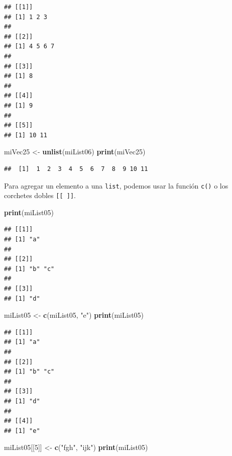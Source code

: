 \documentclass[
]{book}
\newenvironment{Shaded}{\begin{snugshade}}{\end{snugshade}}
\newcommand{\DecValTok}[1]{\textcolor[rgb]{0.00,0.00,0.81}{#1}}
\newcommand{\KeywordTok}[1]{\textcolor[rgb]{0.13,0.29,0.53}{\textbf{#1}}}
\newcommand{\NormalTok}[1]{#1}
\newcommand{\StringTok}[1]{\textcolor[rgb]{0.31,0.60,0.02}{#1}}
\begin{document}
\begin{verbatim}
## [[1]]
## [1] 1 2 3
## 
## [[2]]
## [1] 4 5 6 7
## 
## [[3]]
## [1] 8
## 
## [[4]]
## [1] 9
## 
## [[5]]
## [1] 10 11
\end{verbatim}

\begin{Shaded}
\begin{Highlighting}[]
\NormalTok{miVec25 <-}\StringTok{ }\KeywordTok{unlist}\NormalTok{(miList06)}
\KeywordTok{print}\NormalTok{(miVec25)}
\end{Highlighting}
\end{Shaded}

\begin{verbatim}
##  [1]  1  2  3  4  5  6  7  8  9 10 11
\end{verbatim}

Para agregar un elemento a una \texttt{list}, podemos usar la función \texttt{c()} o los corchetes dobles \texttt{{[}{[}\ {]}{]}}.

\begin{Shaded}
\begin{Highlighting}[]
\KeywordTok{print}\NormalTok{(miList05)}
\end{Highlighting}
\end{Shaded}

\begin{verbatim}
## [[1]]
## [1] "a"
## 
## [[2]]
## [1] "b" "c"
## 
## [[3]]
## [1] "d"
\end{verbatim}

\begin{Shaded}
\begin{Highlighting}[]
\NormalTok{miList05 <-}\StringTok{ }\KeywordTok{c}\NormalTok{(miList05, }\StringTok{"e"}\NormalTok{)}
\KeywordTok{print}\NormalTok{(miList05)}
\end{Highlighting}
\end{Shaded}

\begin{verbatim}
## [[1]]
## [1] "a"
## 
## [[2]]
## [1] "b" "c"
## 
## [[3]]
## [1] "d"
## 
## [[4]]
## [1] "e"
\end{verbatim}

\begin{Shaded}
\begin{Highlighting}[]
\NormalTok{miList05[[}\DecValTok{5}\NormalTok{]] <-}\StringTok{ }\KeywordTok{c}\NormalTok{(}\StringTok{"fgh"}\NormalTok{, }\StringTok{"ijk"}\NormalTok{)}
\KeywordTok{print}\NormalTok{(miList05)}
\end{Highlighting}
\end{Shaded}
\end{document}
